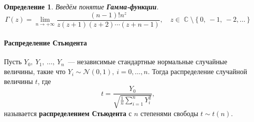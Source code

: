 \documentclass[12pt]{article}
\DeclareMathOperator{\CC}{\mathbb{C}}
\newtheorem*{definition*}{Определение}
\begin{document}
    \begin{definition*}
        Введём понятие \textbf{Гамма-функции}.
        \begin{equation*}
            \Gamma(z) = \lim_{n \to +\infty} \frac{\left(n - 1\right)! n^z}{z(z+1)(z+2)\cdots(z + n - 1)},\hspace{1em} z \in \CC \setminus \left\{0,\ -1,\ -2, \ldots\right\}
        \end{equation*}        
    \end{definition*}

    \paragraph{Распределение Стьюдента}
    Пусть $Y_0,\ Y_1,\ \ldots,\ Y_n$~--- независимые стандартные нормальные случайные величины, такие что $Y_i \sim \mathcal{N}(0, 1),\ i = 0,\ldots,n$.
    Тогда распределение случайной величины $t$, где
    \begin{equation*}
        t={\frac {Y_{0}}{\sqrt {{\frac {1}{n}}\sum \limits _{i=1}^{n}Y_{i}^{2}}}},
    \end{equation*}
    называется \textbf{распределением Стьюдента} с $n$ степенями свободы $t \sim t(n)$.
\end{document}
